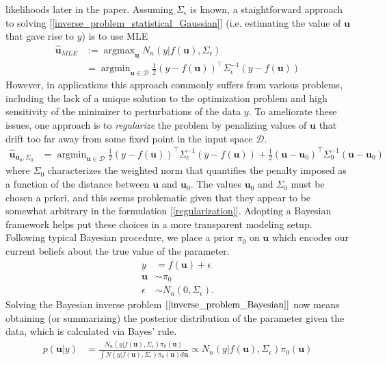 \documentclass[12pt]{article}
\newcommand{\bpar}{\mathbf{u}} %
\DeclareMathOperator*{\argmax}{argmax}
\DeclareMathOperator*{\argmin}{argmin}
\begin{document}
likelihoods later in the paper. Assuming $\Sigma_\epsilon$ is known, a staightforward approach to solving [\ref{inverse_problem_statistical_Gaussian}] (i.e. estimating the value of $\bpar$ 
that gave rise to $y$) is to use MLE
\begin{align}
\hat{\bpar}_{MLE} &:= \argmax_{\bpar} N_n(y|f(\bpar), \Sigma_\epsilon) \\
			     &= \argmin_{\bpar \in \mathcal{D}} \frac{1}{2} (y - f(\bpar))^{\top} \Sigma_\epsilon^{-1} (y - f(\bpar)) \nonumber
\end{align}
However, in applications this approach commonly suffers from various problems, including the lack of a unique solution to the optimization problem and high sensitivity of the minimizer to perturbations of 
the data $y$. To ameliorate these issues, one approach is to \textit{regularize} the problem by penalizing values of $\bpar$ that drift too far away from some fixed point in the input space $\mathcal{D}$. 
\begin{align}
\hat{\bpar}_{\bpar_0, \Sigma_0} &= \argmin_{\bpar \in \mathcal{D}} \frac{1}{2} (y - f(\bpar))^{\top} \Sigma_\epsilon^{-1} (y - f(\bpar)) + \frac{1}{2} (\bpar - \bpar_0)^{\top} \Sigma_0^{-1}(\bpar - \bpar_0) \label{regularization}
\end{align}
where $\Sigma_0$ characterizes the weighted norm that quantifies the penalty imposed as a function of the distance between $\bpar$ and $\bpar_0$. The values $\bpar_0$ and $\Sigma_0$ must be chosen 
a priori, and this seems problematic given that they appear to be somewhat arbitrary in the formulation [\ref{regularization}]. Adopting a Bayesian framework helps put these choices in a more transparent 
modeling setup. Following typical Bayesian procedure, we place a prior $\pi_0$ on $\bpar$ which encodes our current beliefs about the true value of the parameter. 
\begin{align}
y &= f(\bpar) + \epsilon \label{inverse_problem_Bayesian} \\
\bpar &\sim \pi_0 \\
\epsilon &\sim N_n(0, \Sigma_\epsilon) \nonumber.
\end{align}
Solving the Bayesian inverse problem $[\ref{inverse_problem_Bayesian}]$ now means obtaining (or summarizing) the posterior distribution of the parameter given the data, which is calculated via Bayes' rule. 
\begin{align}
p(\bpar|y) &= \frac{N_n(y|f(\bpar), \Sigma_\epsilon)\pi_0(\bpar)}{\int N(y|f(\bpar), \Sigma_\epsilon)\pi_0(\bpar) d\bpar} \propto N_n(y|f(\bpar), \Sigma_\epsilon)\pi_0(\bpar) \label{posterior}
\end{align}
\end{document}
